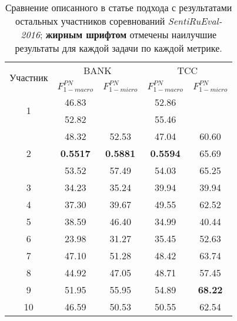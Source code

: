 \begin{table}[htp!]
\centering
\caption{Сравнение описанного в статье подхода с результатами остальных
    участников соревнований {\it SentiRuEval-2016}; {\bf жирным шрифтом}
    отмечены наилучшие результаты для каждой задачи по каждой метрике.}
\label{table:comparison}
\begin{tabular}{ccccc}
\hline
\multicolumn{1}{l|}{\multirow{2}{*}{Участник}} & \multicolumn{2}{c|}{BANK}                                                         & \multicolumn{2}{c}{TCC}                                      \\ \cline{2-5}
\multicolumn{1}{l|}{}                          & \multicolumn{1}{c|}{$F_{1-macro}^{PN}$} & \multicolumn{1}{c|}{$F_{1-micro}^{PN}$} & \multicolumn{1}{c|}{$F_{1-macro}^{PN}$} & $F_{1-micro}^{PN}$ \\ \hline
\multirow{2}{*}{1}          & 46.83          &                  & 52.86                  &                                       \\
                            & 52.82          &                  & 55.46                  &                                       \\ \hline
\multirow{3}{*}{2}          & 48.32          & 52.53            & 47.04                  & 60.60                                 \\
                            & \textbf{0.5517}& \textbf{0.5881}  & \textbf{0.5594}        & 65.69                                 \\
                            &  53.52         & 57.49            & 54.03                  & 65.25                                 \\ \hline
3                           & 34.23          & 35.24            & 39.94                  & 39.94                                 \\
4                           & 37.30          & 39.67            & 49.55                  & 62.52                                 \\
5                           & 38.59          & 46.40            & 34.99                  & 40.44                                 \\
6                           & 23.98          & 31.27            & 35.45                  & 52.63                                 \\
7                           & 47.10          & 51.28            & 48.42                  & 63.74                                 \\
8                           & 44.92          & 47.05            & 48.71                  & 57.45                                 \\
9                           & 51.95          & 55.95            & 54.89                  & \textbf{68.22}                        \\
10                          & 46.59          & 50.53            & 50.55                  & 62.54                                 \\ \hline
\end{tabular}
\end{table}

